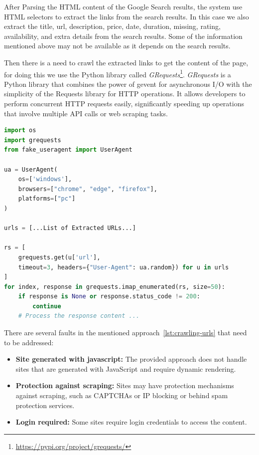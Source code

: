 After Parsing the HTML content of the Google Search results, the system use HTML selectors to extract the links from the search results.
In this case we also extract the title, url, description, price, date, duration, missing, rating, availability, and extra details from the search results.
Some of the information mentioned above may not be available as it depends on the search results.

Then there is a need to crawl the extracted links to get the content of the page, for doing this we use the Python library called \textit{GRequests}\footnote{\url{https://pypi.org/project/grequests/}}.
\textit{GRequests} is a Python library that combines the power of gevent for asynchronous I/O with the simplicity of the Requests library for HTTP operations. It allows developers to perform concurrent HTTP requests easily, significantly speeding up operations that involve multiple API calls or web scraping tasks.

\begin{lstlisting}[language=Python, caption=Crawling the Extracted URLs, label=lst:crawling-urls]
import os
import grequests
from fake_useragent import UserAgent

ua = UserAgent(
    os=['windows'],
    browsers=["chrome", "edge", "firefox"],
    platforms=["pc"]
)

urls = [...List of Extracted URLs...]

rs = [
    grequests.get(u['url'],
    timeout=3, headers={"User-Agent": ua.random}) for u in urls
]
for index, response in grequests.imap_enumerated(rs, size=50):
    if response is None or response.status_code != 200:
        continue
    # Process the response content ...
\end{lstlisting}

There are several faults in the mentioned approach~\ref{lst:crawling-urls} that need to be addressed:
\begin{itemize}
    \item \textbf{Site generated with javascript:} The provided approach does not handle sites that are generated with JavaScript and require dynamic rendering.
    \item \textbf{Protection against scraping:} Sites may have protection mechanisms against scraping, such as CAPTCHAs or IP blocking or behind spam protection services.
    \item \textbf{Login required:} Some sites require login credentials to access the content.
\end{itemize}

